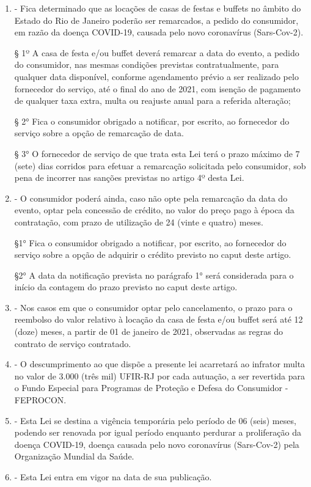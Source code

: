 \documentclass[10pt]{article}
\begin{document}
\begin{enumerate}[label=Art. \arabic*\textdegree]
\item - Fica determinado que as locações de casas de festas e buffets no âmbito do Estado do Rio de Janeiro poderão ser remarcados, a pedido do consumidor, em razão da doença COVID-19, causada pelo novo coronavírus (Sars-Cov-2).

§ 1º A casa de festa e/ou buffet deverá remarcar a data do evento, a pedido do consumidor, nas mesmas condições previstas contratualmente, para qualquer data disponível, conforme agendamento prévio a ser realizado pelo fornecedor do serviço, até o final do ano de 2021, com isenção de pagamento de qualquer taxa extra, multa ou reajuste anual para a referida alteração;

§ 2° Fica o consumidor obrigado a notificar, por escrito, ao fornecedor do serviço sobre a opção de remarcação de data.

§ 3° O fornecedor de serviço de que trata esta Lei terá o prazo máximo de 7 (sete) dias corridos para efetuar a remarcação solicitada pelo consumidor, sob pena de incorrer nas sanções previstas no artigo 4º desta Lei.
\item - O consumidor poderá ainda, caso não opte pela remarcação da data do evento, optar pela concessão de crédito, no valor do preço pago à época da contratação, com prazo de utilização de 24 (vinte e quatro) meses.

§1° Fica o consumidor obrigado a notificar, por escrito, ao fornecedor do serviço sobre a opção de adquirir o crédito previsto no caput deste artigo. 

§2° A data da notificação prevista no parágrafo 1° será considerada para o início da contagem do prazo previsto no caput deste artigo.

\item - Nos casos em que o consumidor optar pelo cancelamento, o prazo para o reembolso do valor relativo à locação da casa de festa e/ou buffet será até 12 (doze) meses, a partir de 01 de janeiro de 2021, observadas as regras do contrato de serviço contratado.

\item - O descumprimento ao que dispõe a presente lei acarretará ao infrator multa no valor de 3.000 (três mil) UFIR-RJ por cada autuação, a ser revertida para o Fundo Especial para Programas de Proteção e Defesa do Consumidor - FEPROCON.

\item - Esta Lei se destina a vigência temporária pelo período de 06 (seis) meses, podendo ser renovada por igual período enquanto perdurar a proliferação da doença COVID-19, doença causada pelo novo coronavírus (Sars-Cov-2) pela Organização Mundial da Saúde.

\item - Esta Lei entra em vigor na data de sua publicação.

\end{enumerate}
\end{document}
